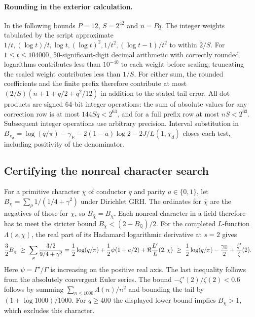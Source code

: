 \documentclass[11pt]{article}
\begin{document}
\paragraph{Rounding in the exterior calculation.}
In the following bounds $P=12$, $S=2^{42}$ and $n=Pq$. The integer weights tabulated by the script approximate
$1/t,(\log t)/t,\log t,(\log t)^2,1/t^2,(\log t-1)/t^2$ to within $2/S$.
For $1\leq t\leq104000$, 50-significant-digit decimal arithmetic with
correctly rounded logarithms contributes less than $10^{-40}$ to each weight
before scaling; truncating the scaled weight contributes less than $1/S$.
For either sum, the rounded coefficients and the finite prefix therefore
contribute at most
$(2/S)(n+1+q/2+q^2/12)$ in addition to the stated tail error.
All dot products are signed 64-bit integer operations:
the sum of absolute values for any correction row is at most $144Sq<2^{63}$,
and for a full prefix row at most $nS<2^{63}$. Subsequent integer operations
use arbitrary precision. Interval substitution in
$B_{\chi_d}=\log(q/\pi)-\gamma_E-2(1-a)\log 2-2J/L(1,\chi_d)$
closes each test, including positivity of the denominator.



\subsection*{Certifying the nonreal character search}
For a primitive character $\chi$ of conductor $q$ and parity
$a\in\{0,1\}$, let $B_\chi=\sum_\rho 1/(1/4+\gamma^2)$ under
Dirichlet GRH. The ordinates for $\bar\chi$ are the negatives of those
for $\chi$, so $B_{\bar\chi}=B_\chi$. Each nonreal character in a field
therefore has to meet the stricter bound $B_\chi<(2-B_{\mathbb Q})/2$.
For the completed $L$-function $\Lambda(s,\chi)$, the real part of its
Hadamard logarithmic derivative at $s=2$ gives
\[
 \frac32 B_\chi\ \ge\ \sum_\rho
 \frac{3/2}{9/4+\gamma^2}
 =\frac12\log(q/\pi)+\frac12\psi(1+a/2)
   +\Re\frac{L'}{L}(2,\chi)
 \ \ge\ \frac12\log(q/\pi)-\frac{\gamma_{\rm E}}2
   +\frac{\zeta'}{\zeta}(2).
\]
Here $\psi=\Gamma'/\Gamma$ is increasing on the positive real axis.
The last inequality follows from the absolutely convergent Euler series.
The bound $-\zeta'(2)/\zeta(2)<0.6$ follows by summing
$\sum_{n\le1000}\Lambda(n)/n^2$ and bounding the tail by
$(1+\log 1000)/1000$. For $q\ge400$ the displayed lower bound implies
$B_\chi>1$, which excludes this character.
\end{document}
